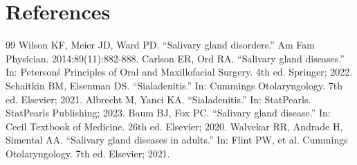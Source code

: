 \section*{References}
\begin{thebibliography}{99}
 Wilson KF, Meier JD, Ward PD. ``Salivary gland disorders.'' Am Fam Physician. 2014;89(11):882-888.
 Carlson ER, Ord RA. ``Salivary gland diseases.'' In: Peterson\'s Principles of Oral and Maxillofacial Surgery. 4th ed. Springer; 2022.
 Schaitkin BM, Eisenman DS. ``Sialadenitis.'' In: Cummings Otolaryngology. 7th ed. Elsevier; 2021.
 Albrecht M, Yanci KA. ``Sialadenitis.'' In: StatPearls. StatPearls Publishing; 2023.
 Baum BJ, Fox PC. ``Salivary gland disease.'' In: Cecil Textbook of Medicine. 26th ed. Elsevier; 2020.
 Walvekar RR, Andrade H, Simental AA. ``Salivary gland diseases in adults.'' In: Flint PW, et al. Cummings Otolaryngology. 7th ed. Elsevier; 2021.
\end{thebibliography}
